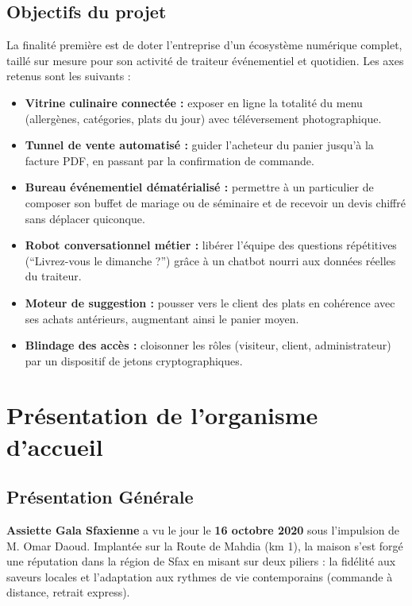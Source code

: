 \subsection{Objectifs du projet}

La finalité première est de doter l'entreprise d'un écosystème numérique complet, taillé sur mesure pour son activité de traiteur événementiel et quotidien. Les axes retenus sont les suivants :

\begin{itemize}
    \item \textbf{Vitrine culinaire connectée :} exposer en ligne la totalité du menu (allergènes, catégories, plats du jour) avec téléversement photographique.
    \item \textbf{Tunnel de vente automatisé :} guider l'acheteur du panier jusqu'à la facture PDF, en passant par la confirmation de commande.
    \item \textbf{Bureau événementiel dématérialisé :} permettre à un particulier de composer son buffet de mariage ou de séminaire et de recevoir un devis chiffré sans déplacer quiconque.
    \item \textbf{Robot conversationnel métier :} libérer l'équipe des questions répétitives (``Livrez-vous le dimanche ?'') grâce à un chatbot nourri aux données réelles du traiteur.
    \item \textbf{Moteur de suggestion :} pousser vers le client des plats en cohérence avec ses achats antérieurs, augmentant ainsi le panier moyen.
    \item \textbf{Blindage des accès :} cloisonner les rôles (visiteur, client, administrateur) par un dispositif de jetons cryptographiques.
\end{itemize}

\section{Présentation de l'organisme d'accueil}

\subsection{Présentation Générale}

\textbf{Assiette Gala Sfaxienne} a vu le jour le \textbf{16 octobre 2020} sous l'impulsion de M. Omar Daoud. Implantée sur la Route de Mahdia (km 1), la maison s'est forgé une réputation dans la région de Sfax en misant sur deux piliers : la fidélité aux saveurs locales et l'adaptation aux rythmes de vie contemporains (commande à distance, retrait express).

